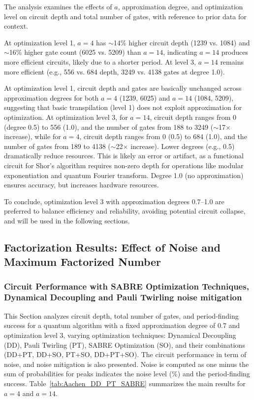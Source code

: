 \documentclass[conference,twoside]{IEEEtran}
\begin{document}
The analysis examines the effects of $a$, approximation degree, and optimization level on circuit depth and total number of gates, with reference to prior data for context.

At optimization level 1, $a=4$ has $\sim$14\% higher circuit depth (1239 vs. 1084) and $\sim$16\% higher gate count (6025 vs. 5209) than $a=14$, indicating $a=14$ produces more efficient circuits, likely due to a shorter period. At level 3, $a=14$ remains more efficient (e.g., 556 vs. 684 depth, 3249 vs. 4138 gates at degree 1.0).

At optimization level 1, circuit depth and gates are basically unchanged across approximation degrees for both $a=4$ (1239, 6025) and $a=14$ (1084, 5209), suggesting that basic transpilation (level 1) does not exploit approximation for optimization. At optimization level 3, for \textit{$a=14$}, circuit depth ranges from 0 (degree 0.5) to 556 (1.0), and the number of gates from 188 to 3249 ($\sim$17$\times$ increase), while for \textit{$a=4$}, circuit depth ranges from 0 (0.5) to 684 (1.0), and the number of gates from 189 to 4138 ($\sim$22$\times$ increase). Lower degrees (e.g., 0.5) dramatically reduce resources. This is likely an error or artifact, as a functional circuit for Shor's algorithm requires non-zero depth for operations like modular exponentiation and quantum Fourier transform. Degree 1.0 (no approximation) ensures accuracy, but increases hardware resources.

To conclude, optimization level 3 with approximation degrees 0.7–1.0 are preferred to balance efficiency and reliability, avoiding potential circuit collapse, and will be used in the following sections.

\subsection{Factorization Results: Effect of Noise and Maximum Factorized Number}
\subsubsection{Circuit Performance with SABRE Optimization Techniques, Dynamical Decoupling and Pauli Twirling noise mitigation}

This Section analyzes circuit depth, total number of gates, and period-finding success for a quantum algorithm with a fixed approximation degree of 0.7 and optimization level 3, varying optimization techniques: Dynamical Decoupling (DD), Pauli Twirling (PT), SABRE Optimization (SO), and their combinations (DD+PT, DD+SO, PT+SO, DD+PT+SO). The circuit performance in term of noise, and noise mitigation is also presented. Noise is computed as one minus the sum of probabilities for peaks indicates the noise level (\%) and the period-finding success. Table~\ref{tab:Aachen_DD_PT_SABRE} summarizes the main results for $a=4$ and $a=14$.
\end{document}
